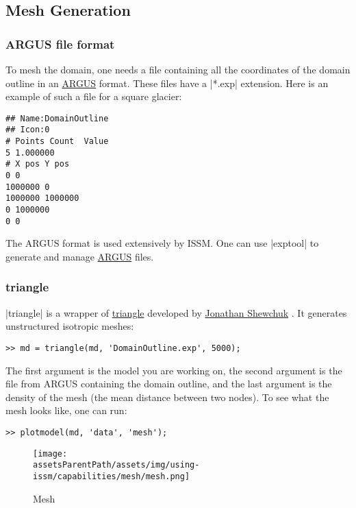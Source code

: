 
\subsection{Mesh Generation} \label{sec:using-issm-capabilities-mesh-generation}
\subsubsection{ARGUS file format}%
To mesh the domain, one needs a file containing all the coordinates of the domain outline in an \href{http://www.argusint.com/}{ARGUS} format. These files have a \lstinlinebg|*.exp| extension. Here is an example of such a file for a square glacier:
\begin{lstlisting}
## Name:DomainOutline
## Icon:0
# Points Count  Value
5 1.000000
# X pos Y pos
0 0
1000000 0
1000000 1000000
0 1000000
0 0
\end{lstlisting}
The ARGUS format is used extensively by ISSM. One can use \lstinlinebg|exptool| to generate and manage \href{http://www.argusint.com/}{ARGUS} files.
\subsubsection{triangle}%
\lstinlinebg|triangle| is a wrapper of \href{http://www.cs.cmu.edu/~quake/triangle.html}{triangle} developed by \href{http://www.cs.berkeley.edu/~jrs/}{Jonathan Shewchuk} \citep{Shewchuk1996}. It generates unstructured isotropic meshes:
\begin{lstlisting}
>> md = triangle(md, 'DomainOutline.exp', 5000);
\end{lstlisting}
The first argument is the model you are working on, the second argument is the file from ARGUS containing the domain outline, and the last argument is the density of the mesh (the mean distance between two nodes). To see what the mesh looks like, one can run:
\begin{lstlisting}
>> plotmodel(md, 'data', 'mesh');
\end{lstlisting}
\begin{figure}[H]
	\begin{center}
		\texttt{[image: \\assetsParentPath/assets/img/using-issm/capabilities/mesh/mesh.png]}
		\caption{Mesh}
	\end{center}
\end{figure}


